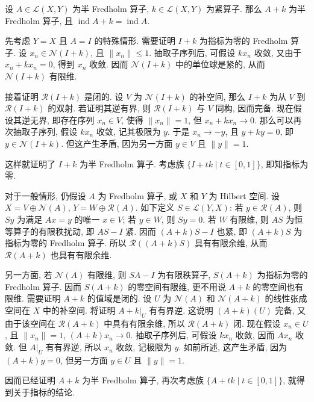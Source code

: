 \begin{Theorem}
\label{thm:compact-perturbation-fredholm-index-invariance}
设 $A\in\mathcal{L}(X,Y)$ 为半 Fredholm 算子, $k\in\mathcal{L}(X,Y)$ 为紧算子. 那么 $A+k$ 为半 Fredholm 算子, 且 $\operatorname{ind}A+k=\operatorname{ind}A$.
\end{Theorem}

\begin{Proof}
先考虑 $Y=X$ 且 $A=I$ 的特殊情形. 需要证明 $I+k$ 为指标为零的 Fredholm 算子. 设 $x_n\in\mathcal{N}(I+k)$, 且 $\|x_n\|\leq1$. 抽取子序列后, 可假设 $kx_n$ 收敛, 又由于 $x_n+kx_n=0$, 得到 $x_n$ 收敛. 因而 $\mathcal{N}(I+k)$ 中的单位球是紧的, 从而 $\mathcal{N}(I+k)$ 有限维.

接着证明 $\mathcal{R}(I+k)$ 是闭的. 设 $V$ 为 $\mathcal{N}(I+k)$ 的补空间, 那么 $I+k$ 为从 $V$ 到 $\mathcal{R}(I+k)$ 的双射. 若证明其逆有界, 则 $\mathcal{R}(I+k)$ 与 $V$ 同构, 因而完备. 现在假设其逆无界, 即存在序列 $x_n\in V$, 使得 $\|x_n\|=1$, 但 $x_n+kx_n\to0$. 那么可以再次抽取子序列, 假设 $kx_n$ 收敛, 记其极限为 $y$. 于是 $x_n\to-y$, 且 $y+ky=0$, 即 $y\in\mathcal{N}(I+k)$. 但这产生矛盾, 因为另一方面 $y\in V$ 且 $\|y\|=1$.

这样就证明了 $I+k$ 为半 Fredholm 算子. 考虑族 $\{I+tk\mid t\in[0,1]\}$, 即知指标为零.

对于一般情形, 仍假设 $A$ 为 Fredholm 算子, 或 $X$ 和 $Y$ 为 Hilbert 空间. 设 $X=V\oplus\mathcal{N}(A)$, $Y=W\oplus\mathcal{R}(A)$. 如下定义 $S\in\mathcal{L}(Y,X)$: 若 $y\in\mathcal{R}(A)$, 则 $Sy$ 为满足 $Ax=y$ 的唯一 $x\in V$; 若 $y\in W$, 则 $Sy=0$. 若 $W$ 有限维, 则 $AS$ 为恒等算子的有限秩扰动, 即 $AS-I$ 紧. 因而 $(A+k)S-I$ 也紧, 即 $(A+k)S$ 为指标为零的 Fredholm 算子. 所以 $\mathcal{R}((A+k)S)$ 具有有限余维, 从而 $\mathcal{R}(A+k)$ 也具有有限余维.

另一方面, 若 $\mathcal{N}(A)$ 有限维, 则 $SA-I$ 为有限秩算子, $S(A+k)$ 为指标为零的 Fredholm 算子. 因而 $S(A+k)$ 的零空间有限维, 更不用说 $A+k$ 的零空间也有限维. 需要证明 $A+k$ 的值域是闭的. 设 $U$ 为 $\mathcal{N}(A)$ 和 $\mathcal{N}(A+k)$ 的线性张成空间在 $X$ 中的补空间. 将证明 $A+k|_U$ 有有界逆. 这说明 $(A+k)(U)$ 完备, 又由于该空间在 $\mathcal{R}(A+k)$ 中具有有限余维, 所以 $\mathcal{R}(A+k)$ 闭. 现在假设 $x_n\in U$, 且 $\|x_n\|=1$, $(A+k)x_n\to0$. 抽取子序列后, 可假设 $kx_n$ 收敛, 因而 $Ax_n$ 收敛. 但 $A|_U$ 有有界逆, 所以 $x_n$ 收敛, 记极限为 $y$. 如前所述, 这产生矛盾, 因为 $(A+k)y=0$, 但另一方面 $y\in U$ 且 $\|y\|=1$.

因而已经证明 $A+k$ 为半 Fredholm 算子, 再次考虑族 $\{A+tk\mid t\in[0,1]\}$, 就得到关于指标的结论.
\end{Proof}

